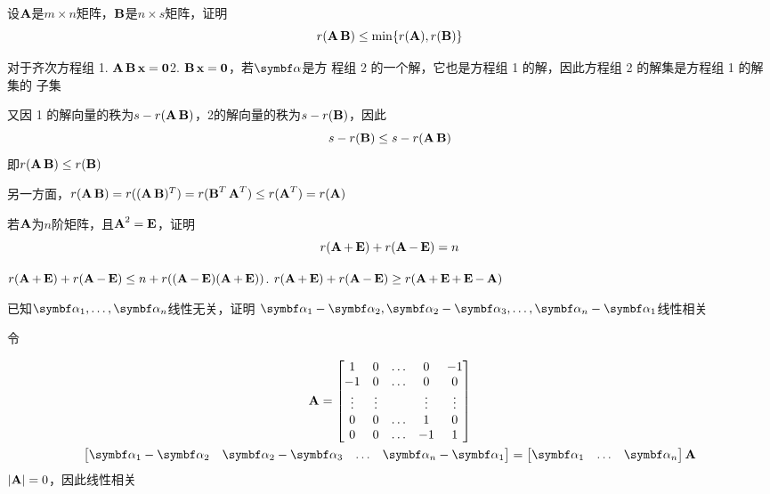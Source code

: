 \documentclass{article}
\begin{document}
\begin{examplle}[]
设\(\bA\)是\(m\times n\)矩阵，\(\bB\)是\(n\times s\)矩阵，证明
\begin{equation*}
r(\bA\bB)\le\min\{r(\bA),r(\bB)\}
\end{equation*}

对于齐次方程组 1. \(\bA\bB\bx=\bzero\)2. \(\bB\bx=\bzero\)，若\(\balpha\)是方
程组 2 的一个解，它也是方程组 1 的解，因此方程组 2 的解集是方程组 1 的解集的
子集

又因 1 的解向量的秩为\(s-r(\bA\bB)\)，2的解向量的秩为\(s-r(\bB)\)，因此
\begin{equation*}
s-r(\bB)\le s-r(\bA\bB)
\end{equation*}
即\(r(\bA\bB)\le r(\bB)\)

另一方面，\(r(\bA\bB)=r((\bA\bB)^T)=r(\bB^T\bA^T)\le r(\bA^T)=r(\bA)\)
\end{examplle}

\begin{examplle}[]
若\(\bA\)为\(n\)阶矩阵，且\(\bA^2=\bE\)，证明
\begin{equation*}
r(\bA+\bE)+r(\bA-\bE)=n
\end{equation*}

\(r(\bA+\bE)+r(\bA-\bE)\le n+r((\bA-\bE)(\bA+\bE))\).
\(r(\bA+\bE)+r(\bA-\bE)\ge r(\bA+\bE+\bE-\bA)\)
\end{examplle}

\begin{examplle}[]
已知\(\balpha_1,\dots,\balpha_n\)线性无关，证明
\(\balpha_1-\balpha_2,\balpha_2-\balpha_3,\dots,\balpha_n-\balpha_1\)线性相关

令

\begin{gather*}
\bA=
\begin{bmatrix}
1&0&\dots&0&-1\\
-1&0&\dots&0&0\\
\vdots&\vdots&&\vdots&\vdots\\
0&0&\dots&1&0\\
0&0&\dots&-1&1
\end{bmatrix}\\
\begin{bmatrix}
\balpha_1-\balpha_2&\balpha_2-\balpha_3&\dots&\balpha_n-\balpha_1
\end{bmatrix}=
\begin{bmatrix}
\balpha_1&\dots&\balpha_n
\end{bmatrix}
\bA
\end{gather*}
\(\abs{\bA}=0\)，因此线性相关
\end{examplle}
\end{document}
